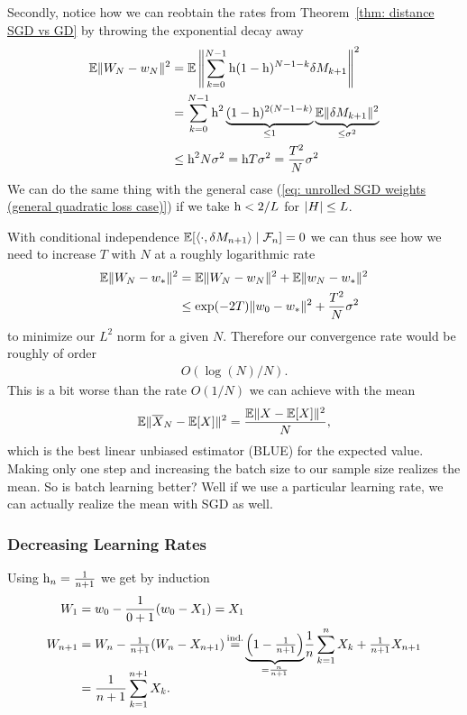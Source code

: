 Secondly, notice how we can reobtain the rates from Theorem~\ref{thm: distance
SGD vs GD} by throwing the exponential decay away
\begin{align*}
	\mathbb{E}\|W_N-w_N\|^2
	&= \mathbb{E}\left\|\sum_{k=0}^{N-1}\text{h}(1-\text{h})^{N-1-k}\delta M_{k+1}\right\|^2\\
	&= \sum_{k=0}^{N-1}\text{h}^2\underbrace{(1-\text{h})^{2(N-1-k)}}_{\le1}
	\underbrace{\mathbb{E}\|\delta M_{k+1}\|^2}_{\le \sigma^2}\\
	&\le \text{h}^2 N \sigma^2 = \text{h} T\sigma^2 = \frac{T^2}{N}\sigma^2
\end{align*}
We can do the same thing with the general case (\ref{eq: unrolled SGD weights
(general quadratic loss case)}) if we take \(\text{h}<2/L\) for \(|H|\le L\).

With conditional independence \(\mathbb{E}[\langle \cdot, \delta M_{n+1}\rangle\mid\mathcal{F}_n]=0\)
we can thus see how we need to increase \(T\) with \(N\) at a roughly
logarithmic rate
\begin{align*}
	\mathbb{E}\|W_N - w_*\|^2
	&= \mathbb{E}\|W_N - w_N\|^2 +\mathbb{E}\|w_N - w_*\|^2\\
	&\le \exp(-2T)\|w_0 - w_*\|^2 + \frac{T^2}{N}\sigma^2
\end{align*}
to minimize our \(L^2\) norm for a given \(N\). Therefore our convergence rate
would be roughly of order
\begin{align*}
	O(\log(N)/N).
\end{align*}
This is a bit worse than the rate \(O(1/N)\) we can achieve with the mean
\begin{align*}
	\mathbb{E}\|\overline{X}_N - \mathbb{E}[X]\|^2 = \frac{\mathbb{E}\|X-\mathbb{E}[X]\|^2}{N},
\end{align*}
which is the best linear unbiased estimator (BLUE) for the expected value.
Making only one step and increasing the batch size to our sample size realizes
the mean. So is batch learning better? Well if we use a particular learning rate,
we can actually realize the mean with SGD as well.

\subsubsection{Decreasing Learning Rates}

Using \(\text{h}_n=\frac1{n+1}\) we get by induction
\begin{align}
	\label{eq: getting rid of w_0 first step}
	\Weights_1 &= \weights_0 - \frac{1}{0+1}(\weights_0 - X_1) = X_1\\
	\label{eq: telescoping product}
	\Weights_{n+1}
	&= \Weights_n - \tfrac{1}{n+1}(\Weights_n - X_{n+1})
	\xeq{\text{ind.}}\smash{\underbrace{\left(1-\tfrac1{n+1}\right)}_{=\frac{n}{n+1}}}
	\frac1n\sum_{k=1}^n X_k + \tfrac{1}{n+1}X_{n+1}\\
	\nonumber
	&= \frac{1}{n+1}\sum_{k=1}^{n+1}X_k.
\end{align}

